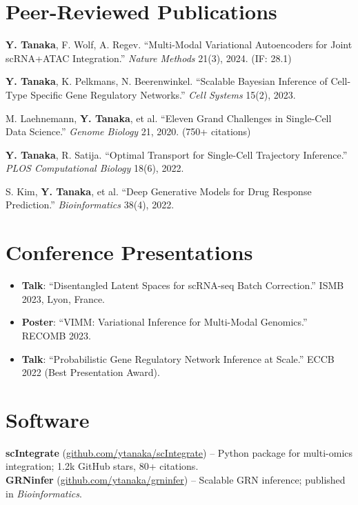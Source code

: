 \documentclass[11pt,a4paper]{article}
\begin{document}
\section{Peer-Reviewed Publications}
\begin{enumerate}[leftmargin=*, label={[\arabic*]}]
  \item \textbf{Y. Tanaka}, F. Wolf, A. Regev. ``Multi-Modal Variational Autoencoders for Joint scRNA+ATAC Integration.'' \textit{Nature Methods} 21(3), 2024. (IF: 28.1)
  \item \textbf{Y. Tanaka}, K. Pelkmans, N. Beerenwinkel. ``Scalable Bayesian Inference of Cell-Type Specific Gene Regulatory Networks.'' \textit{Cell Systems} 15(2), 2023.
  \item M. Laehnemann, \textbf{Y. Tanaka}, et al. ``Eleven Grand Challenges in Single-Cell Data Science.'' \textit{Genome Biology} 21, 2020. (750+ citations)
  \item \textbf{Y. Tanaka}, R. Satija. ``Optimal Transport for Single-Cell Trajectory Inference.'' \textit{PLOS Computational Biology} 18(6), 2022.
  \item S. Kim, \textbf{Y. Tanaka}, et al. ``Deep Generative Models for Drug Response Prediction.'' \textit{Bioinformatics} 38(4), 2022.
\end{enumerate}

\section{Conference Presentations}
\begin{itemize}
  \item \textbf{Talk}: ``Disentangled Latent Spaces for scRNA-seq Batch Correction.'' ISMB 2023, Lyon, France.
  \item \textbf{Poster}: ``VIMM: Variational Inference for Multi-Modal Genomics.'' RECOMB 2023.
  \item \textbf{Talk}: ``Probabilistic Gene Regulatory Network Inference at Scale.'' ECCB 2022 (Best Presentation Award).
\end{itemize}

\section{Software}
\noindent\textbf{scIntegrate} (\href{https://github.com/ytanaka/scIntegrate}{github.com/ytanaka/scIntegrate}) -- Python package for multi-omics integration; 1.2k GitHub stars, 80+ citations.\\
\noindent\textbf{GRNinfer} (\href{https://github.com/ytanaka/grninfer}{github.com/ytanaka/grninfer}) -- Scalable GRN inference; published in \textit{Bioinformatics}.
\end{document}
